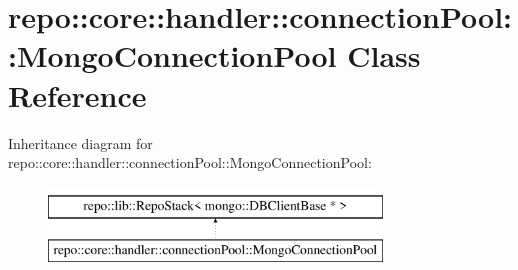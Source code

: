 \hypertarget{classrepo_1_1core_1_1handler_1_1connection_pool_1_1_mongo_connection_pool}{}\section{repo\+:\+:core\+:\+:handler\+:\+:connection\+Pool\+:\+:Mongo\+Connection\+Pool Class Reference}
\label{classrepo_1_1core_1_1handler_1_1connection_pool_1_1_mongo_connection_pool}
Inheritance diagram for repo\+:\+:core\+:\+:handler\+:\+:connection\+Pool\+:\+:Mongo\+Connection\+Pool\+:\begin{figure}[H]
\begin{center}
\leavevmode
\includegraphics[height=2.000000cm]{classrepo_1_1core_1_1handler_1_1connection_pool_1_1_mongo_connection_pool}
\end{center}
\end{figure}
